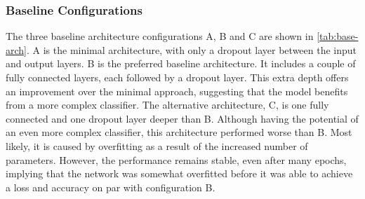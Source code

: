 \subsubsection{Baseline Configurations}

The three baseline architecture configurations A, B and C are shown in \autoref{tab:base-arch}. A is the minimal architecture, with only a dropout layer between the input and output layers. B is the preferred baseline architecture. It includes a couple of fully connected layers, each followed by a dropout layer. This extra depth offers an improvement over the minimal approach, suggesting that the model benefits from a more complex classifier. The alternative architecture, C, is one fully connected and one dropout layer deeper than B. Although having the potential of an even more complex classifier, this architecture performed worse than B. Most likely, it is caused by overfitting as a result of the increased number of parameters. However, the performance remains stable, even after many epochs, implying that the network was somewhat overfitted before it was able to achieve a loss and accuracy on par with configuration B.

